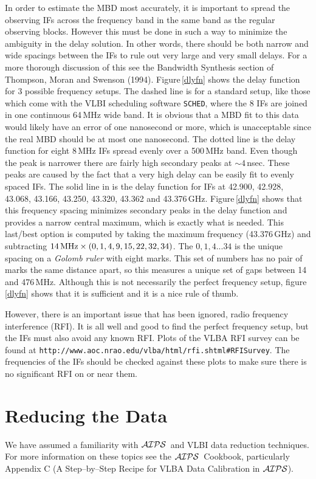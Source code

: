 \documentclass[preprint]{aastex}
\newcommand{\AIPS}{{$\cal AIPS\/$}}
\begin{document}
In order to estimate the MBD most accurately, it is important
to spread the observing IFs across the frequency band in the same band
as the regular observing blocks.  However this must
be done in such a way to minimize the ambiguity in the delay solution.  In
other words, there should be both narrow and wide spacings between the
IFs to rule out very large and very small delays.
For a more thorough discussion of this see the Bandwidth Synthesis section
of Thompson, Moran and Swenson (1994).  Figure\,\ref{dlyfn} shows the
delay function for 3 possible frequency setups.  The dashed line is for a
standard setup, like those which come with the VLBI scheduling software
{\tt SCHED}, where the 8 IFs are joined in one continuous 64\,MHz wide band.
It is obvious that a MBD fit to this data would likely
have an error of one nanosecond or more, which is unacceptable since the real
MBD should be at most one nanosecond.  The dotted line is the delay function
for eight 8\,MHz IFs spread evenly over a 500\,MHz band.  Even though the
peak is narrower there are fairly high secondary peaks at $\sim 4$\,nsec.  These
peaks are caused by the fact that a very high delay can be easily fit to
evenly spaced IFs.  The solid line in is the delay function
for IFs at  42.900, 42.928, 43.068, 43.166, 43.250, 43.320,
43.362 and 43.376\,GHz. Figure\,\ref{dlyfn} shows that this frequency spacing minimizes
secondary peaks in the delay function and provides a narrow central maximum, which
is exactly what is needed.
This last/best option is computed by taking the maximum frequency (43.376\,GHz) and
subtracting $14\,{\rm MHz} \times(0, 1, 4, 9, 15, 22, 32, 34)$.
The $0, 1, 4 ... 34$ is the unique spacing on a {\it Golomb ruler} with
eight marks.  This set of numbers has no pair of marks the same distance apart, so
this measures a unique set of gaps between 14 and 476\,MHz.  Although this
is not necessarily the perfect frequency setup, figure\,\ref{dlyfn} shows that
it is sufficient and it is a nice rule of thumb.

However, there is an important issue that
has been ignored, radio frequency interference (RFI).  It is all well and good
to find the perfect frequency setup, but the IFs must also avoid any known RFI.
Plots of the VLBA RFI survey can be found at
{\tt http://www.aoc.nrao.edu/vlba/html/rfi.shtml\#RFISurvey}.  The frequencies of
the IFs should be checked against these plots to make sure there is no significant
RFI on or near them.

\section{Reducing the Data}
We have assumed a familiarity with \AIPS\ and VLBI data reduction techniques.  For
more information on these topics see the \AIPS\ Cookbook, particularly
Appendix C (A Step--by--Step Recipe for VLBA Data Calibration in \AIPS).
\end{document}
